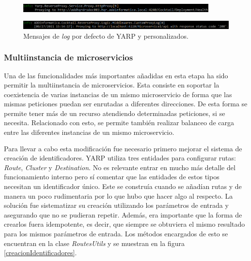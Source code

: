 \documentclass[11pt,spanish,listoffigures]{tfgetsinf}
\begin{document}
\begin{figure}[ht]
\centering
\includegraphics[width=0.9\textwidth]{imagenes/logsYARP}
\end{figure}
\begin{figure}[ht]
\centering
\includegraphics[width=1\textwidth]{imagenes/logs}
\caption{Mensajes de \emph{log} por defecto de YARP y personalizados.}
	\label{logs}
\end{figure}


			\subsubsection{Multiinstancia de microservicios}

Una de las funcionalidades más importantes añadidas en esta etapa ha sido permitir la multiinstancia de microservicios. Esta consiste en soportar la coexistencia de varias instancias de un mismo microservicio de forma que las mismas peticiones puedan ser enrutadas a diferentes direcciones. De esta forma se permite tener más de un recurso atendiendo determinadas peticiones, si se necesita. Relacionado con esto, se permite también realizar balanceo de carga entre las diferentes instancias de un mismo microservicio.

Para llevar a cabo esta modificación fue necesario primero mejorar el sistema de creación de identificadores. YARP utiliza tres entidades para configurar rutas: \emph{Route}, \emph{Cluster} y \emph{Destination}. No es relevante entrar en mucho más detalle del funcionamiento interno pero sí comentar que las entidades de estos tipos necesitan un identificador único. Este se construía cuando se añadían rutas y de manera un poco rudimentaria por lo que hubo que hacer algo al respecto. La solución fue sistematizar su creación utilizando los parámetros de entrada y asegurando que no se pudieran repetir. Además, era importante que la forma de crearlos fuera idempotente, es decir, que siempre se obtuviera el mismo resultado para los mismos parámetros de entrada. Los métodos encargados de esto se encuentran en la clase \emph{RoutesUtils} y se muestran en la figura \ref{creacionIdentificadores}.
\end{document}
